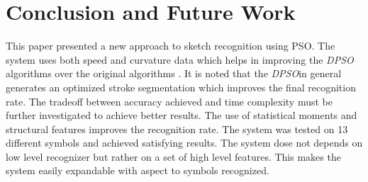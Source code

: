 \documentclass[a4paper,10pt]{IEEEconf}
\begin{document}
% 
%		
\section{Conclusion and Future Work}
\label{ConclusionandFutureWork}
This paper presented a new approach to sketch recognition using PSO. The system uses both speed and curvature data which helps in improving the \textit{DPSO} algorithms over the original algorithms \cite{CruveDivisionSwarm,PolygonApproximationPSO}. It is noted that the \textit{DPSO}in general generates an optimized stroke segmentation which improves the final recognition rate.  The tradeoff between accuracy achieved and time complexity must be further investigated to achieve better results. The use of statistical moments and structural features improves the recognition rate. The system was tested on 13 different symbols and achieved satisfying results. The system dose not depends on low level recognizer but rather on a set of high level features. This makes the system easily expandable with aspect to symbols recognized. 
\end{document}
